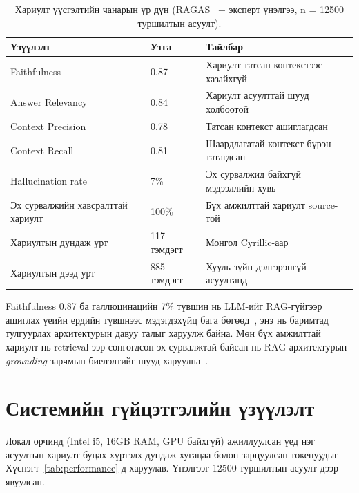\begin{table}[H]
\centering
\begin{tabular}{|p{6.0cm}|p{2.6cm}|p{4.6cm}|}
\hline
\textbf{Үзүүлэлт} & \textbf{Утга} & \textbf{Тайлбар} \\ \hline
Faithfulness & 0.87 & Хариулт татсан контекстээс хазайхгүй \\ \hline
Answer Relevancy & 0.84 & Хариулт асуулттай шууд холбоотой \\ \hline
Context Precision & 0.78 & Татсан контекст ашиглагдсан \\ \hline
Context Recall & 0.81 & Шаардлагатай контекст бүрэн татагдсан \\ \hline
Hallucination rate & 7\% & Эх сурвалжид байхгүй мэдээллийн хувь \\ \hline
Эх сурвалжийн хавсралттай хариулт & 100\% & Бүх амжилттай хариулт source-той \\ \hline
Хариултын дундаж урт & 117 тэмдэгт & Монгол Cyrillic-аар \\ \hline
Хариултын дээд урт & 885 тэмдэгт & Хууль зүйн дэлгэрэнгүй асуултанд \\ \hline
\end{tabular}
\caption[Generation-ийн чанарын үр дүн]{Хариулт үүсгэлтийн чанарын үр дүн (RAGAS~\cite{ragas} + эксперт үнэлгээ, n = 12500 туршилтын асуулт).}
\label{tab:generation-results}
\end{table}


Faithfulness 0.87 ба галлюцинацийн 7\% түвшин нь LLM-ийг RAG-гүйгээр ашиглах үеийн ердийн түвшнээс мэдэгдэхүйц бага бөгөөд~\cite{hallucination_survey,ji_hallucination_survey}, энэ нь баримтад тулгуурлах архитектурын давуу талыг харуулж байна. Мөн бүх амжилттай хариулт нь retrieval-ээр сонгогдсон эх сурвалжтай байсан нь RAG архитектурын \textit{grounding} зарчмын биелэлтийг шууд харуулна~\cite{rag_survey,grounded_generation}.


\section{Системийн гүйцэтгэлийн үзүүлэлт}

Локал орчинд (Intel i5, 16GB RAM, GPU байхгүй) ажиллуулсан үед нэг асуултын хариулт буцах хүртэлх дундаж хугацаа болон зарцуулсан токенуудыг Хүснэгт~\ref{tab:performance}-д харуулав. Үнэлгээг 12500 туршилтын асуулт дээр явуулсан.

